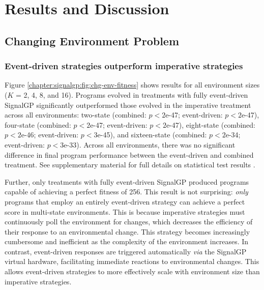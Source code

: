 \section{Results and Discussion}
\label{chapter:signalgp:sec:results-and-discussion}

\subsection{Changing Environment Problem}




\subsubsection{Event-driven strategies outperform imperative strategies}

Figure \ref{chapter:signalgp:fig:chg-env-fitness} shows results for all environment sizes ($K$ = 2, 4, 8, and 16). 
Programs evolved in treatments with fully event-driven SignalGP significantly outperformed those evolved in the imperative treatment across all environments: two-state (combined: $p<2$e-47; event-driven: $p<2$e-47), four-state (combined: $p<2$e-47; event-driven: $p<2$e-47), eight-state (combined: $p<2$e-46; event-driven: $p<3$e-45), and sixteen-state (combined: $p<2$e-34; event-driven: $p<3$e-33). Across all environments, there was no significant difference in final program performance between the event-driven and combined treatment. 
See supplementary material for full details on statistical test results \citep{signalgp_supplement_2018}. 

Further, only treatments with fully event-driven SignalGP produced programs capable of achieving a perfect fitness of 256. 
This result is not surprising: \textit{only} programs that employ an entirely event-driven strategy can achieve a perfect score in multi-state environments. 
This is because imperative strategies must continuously poll the environment for changes, which decreases the efficiency of their response to an environmental change.
This strategy becomes increasingly cumbersome and inefficient as the complexity of the environment increases. 
In contrast, event-driven responses are triggered automatically \textit{via} the SignalGP virtual hardware, facilitating immediate reactions to environmental changes.
This allows event-driven strategies to more effectively scale with environment size than imperative strategies. 

